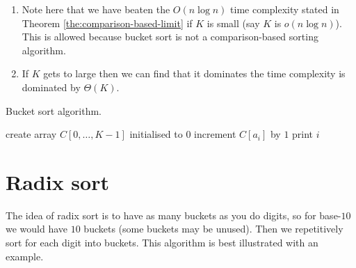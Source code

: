 \begin{remark}
    \begin{enumerate}
        \item Note here that we have beaten the $O(n \log{n})$ time complexity stated in Theorem \ref{the:comparison-based-limit} if $K$ is small (say $K$ is $o(n \log{n})$). This is allowed because bucket sort is not a comparison-based sorting algorithm. 
    
        \item If $K$ gets to large then we can find that it dominates the time complexity is dominated by $\Theta(K)$.
    \end{enumerate}
\end{remark}

\begin{algorithm}
    \caption{Bucket sort algorithm.}
    \label{alg:bucket_sort}
    \begin{algorithmic}[1]
            \State create array $C[0, \ldots, K - 1]$ initialised to $0$
                \State increment $C[a_i]$ by $1$
            \EndFor
                    \State print $i$
                \EndFor
            \EndFor
        \EndProcedure
    \end{algorithmic}
\end{algorithm}

\section{Radix sort}

The idea of radix sort is to have as many buckets as you do digits, so for base-$10$ we would have $10$ buckets (some buckets may be unused). Then we repetitively sort for each digit into buckets. This algorithm is best illustrated with an example.


